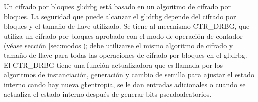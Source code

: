 %
%

Un cifrado por bloques \gls{gl:drbg} está basado en un algoritmo de cifrado por
bloques. La seguridad que puede alcanzar el \gls{gl:drbg} depende del cifrado
por bloques y el tamaño de llave utilizado. Se tiene al mecanismo CTR\_DRBG,
que utiliza un cifrado por bloques aprobado con el modo de operación de
contador (véase sección \ref{sec:modos}); debe utilizarse el mismo algoritmo
de cifrado y tamaño de llave para todas las operaciones de cifrado por bloques
en el \gls{gl:drbg}. El CTR\_DRBG tiene una función actualizadora que es llamada
por los algoritmos de instanciación, generación y cambio de semilla para ajustar
el estado interno cando hay nueva \gls{gl:entropia}, se le dan entradas
adicionales o cuando se actualiza el estado interno después de generar bits
pseudoaleatorios.